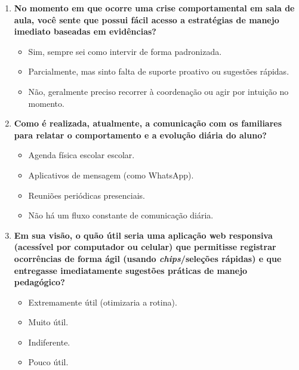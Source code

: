 \documentclass[%
    	        oneside,                   %
]{configuracoes/norma-abntex2}
\begin{document}
\begin{apendicesenv}
\begin{enumerate}
    \item \textbf{No momento em que ocorre uma crise comportamental em sala de aula, você sente que possui fácil acesso a estratégias de manejo imediato baseadas em evidências?}
    \begin{itemize}
        \item[ ] Sim, sempre sei como intervir de forma padronizada.
        \item[ ] Parcialmente, mas sinto falta de suporte proativo ou sugestões rápidas.
        \item[ ] Não, geralmente preciso recorrer à coordenação ou agir por intuição no momento.
    \end{itemize}

    \item \textbf{Como é realizada, atualmente, a comunicação com os familiares para relatar o comportamento e a evolução diária do aluno?}
    \begin{itemize}
        \item[ ] Agenda física escolar escolar.
        \item[ ] Aplicativos de mensagem (como WhatsApp).
        \item[ ] Reuniões periódicas presenciais.
        \item[ ] Não há um fluxo constante de comunicação diária.
    \end{itemize}

    \item \textbf{Em sua visão, o quão útil seria uma aplicação web responsiva (acessível por computador ou celular) que permitisse registrar ocorrências de forma ágil (usando \textit{chips}/seleções rápidas) e que entregasse imediatamente sugestões práticas de manejo pedagógico?}
    \begin{itemize}
        \item[ ] Extremamente útil (otimizaria a rotina).
        \item[ ] Muito útil.
        \item[ ] Indiferente.
        \item[ ] Pouco útil.
    \end{itemize}
\end{enumerate}

\end{apendicesenv}
\end{document}
